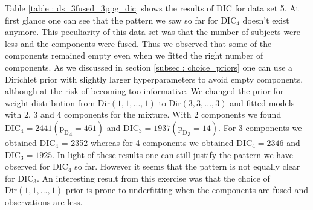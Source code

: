 Table \ref{table : ds_3fused_3ppg_dic} shows the results of DIC for data set 5. At first glance one can see that the pattern we saw so far for $\text{DIC}_4$ doesn't exist anymore. This peculiarity of this data set was that the number of subjects were less and the components were fused. Thus we observed that some of the components remained empty even when we fitted the right number of components. As we discussed in section \ref{subsec : choice_priors} one can use a Dirichlet prior with slightly larger hyperparameters to avoid empty components, although at the risk of becoming too informative. We changed the prior for weight distribution from $\text{Dir}(1, 1, ..., 1)$ to $\text{Dir}(3, 3, ..., 3)$ and fitted models with 2, 3 and 4 components for the mixture. With 2 components we found $\text{DIC}_4 = 2441 ({\text{p}_\text{D}}_4 = 461)$ and $\text{DIC}_3 = 1937 ({\text{p}_\text{D}}_3 = 14)$. For 3 components we obtained $\text{DIC}_4$ = 2352 whereas for 4 components we obtained $\text{DIC}_4 = 2346$ and $\text{DIC}_3 = 1925$. In light of these results one can still justify the pattern we have observed for $\text{DIC}_4$ so far. However it seems that the pattern is not equally clear for $\text{DIC}_3$. An interesting result from this exercise was that the choice of $\text{Dir}(1, 1, ..., 1)$ prior is prone to underfitting when the components are fused and observations are less.

